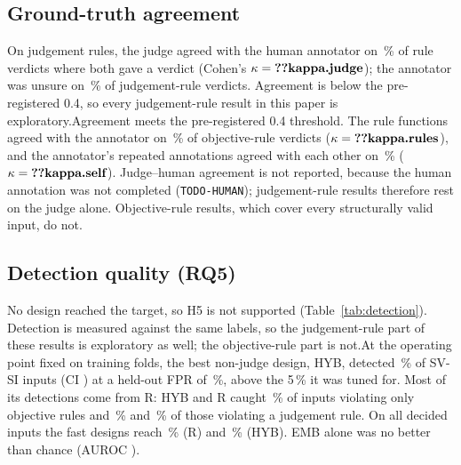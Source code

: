 \documentclass[conference]{IEEEtran}
\begin{document}
\subsection{Ground-truth agreement}
\ifhumanlabels On judgement rules, the judge agreed with the human annotator on \,\% of
 rule verdicts where both gave a verdict (Cohen's $\kappa=\R{kappa.judge}$); the annotator
was unsure on \,\% of judgement-rule verdicts. \ifjudgeweak Agreement is below the
pre-registered 0.4, so every judgement-rule result in this paper is exploratory.\else Agreement meets
the pre-registered 0.4 threshold.\fi{} The rule functions agreed with the annotator on
\,\% of objective-rule verdicts ($\kappa=\R{kappa.rules}$), and the annotator's
repeated annotations agreed with each other on \,\% ($\kappa=\R{kappa.self}$).\else
Judge--human agreement is not reported, because the human annotation was not completed
(\texttt{TODO-HUMAN}); judgement-rule results therefore rest on the judge alone. Objective-rule
results, which cover every structurally valid input, do not.\fi

\subsection{Detection quality (RQ5)}

No design reached the target, so H5 is not supported (Table~\ref{tab:detection}).\ifjudgeweak{}
Detection is measured against the same labels, so the judgement-rule part of these results is
exploratory as well; the objective-rule part is not.\fi At the operating
point fixed on training folds, the best non-judge design, HYB, detected \,\% of SV-SI
inputs (CI ) at a held-out FPR of \,\%, above the 5\,\% it was tuned for.
Most of its detections come from R: HYB and R caught \,\% of inputs violating only objective
rules and \,\% and \,\% of those violating a judgement rule. On all
decided inputs the fast designs reach \,\% (R) and \,\% (HYB).
EMB alone was no better than chance (AUROC ).
\end{document}
